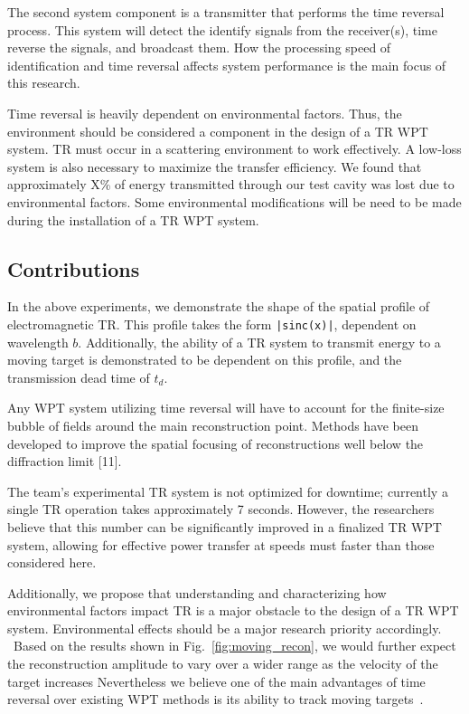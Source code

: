 The second system component is a transmitter that performs the time reversal process.  This system will detect the identify signals from the receiver(s), time reverse the signals, and broadcast them.   How the processing speed of identification and time reversal affects system performance is the main focus of this research.

Time reversal is heavily dependent on environmental factors.  Thus, the environment should be considered a component in the design of a TR WPT system.  TR must occur in a scattering environment to work effectively.  A low-loss system is also necessary to maximize the transfer efficiency. We found that approximately X\% of energy  transmitted through our test cavity was lost due to environmental factors. Some environmental modifications will be need to be made during the installation of a TR WPT system.

\subsection{Contributions}
\label{sec:Contrib}

In the above experiments, we demonstrate the shape of the spatial profile of electromagnetic
TR. This profile takes the form \texttt{|sinc(x)|}, dependent on wavelength $b$.
Additionally, the ability of a TR system to transmit energy to a moving target is 
demonstrated to be dependent on this profile, and the transmission dead 
time of $t_{d}$.

Any WPT system utilizing time reversal will have to account for the 
finite-size bubble of fields around  the  main  reconstruction  point.
Methods  have  been developed  to  improve  the  spatial  focusing  of  reconstructions
well below the diffraction limit [11].

The team’s experimental TR system is not optimized for downtime; currently a
single TR operation takes approximately 7 seconds.  However, the researchers 
believe that this number can be significantly improved in a finalized TR WPT 
system, allowing for effective power transfer at speeds must faster than those 
considered here.

Additionally, we propose that understanding and characterizing how environmental 
factors impact TR is a major obstacle to the design of a TR WPT system. Environmental
effects should be a major research priority accordingly.
\
Based on the results shown in Fig.~\ref{fig:moving_recon}, we would further
expect the reconstruction amplitude to vary over a wider range as the velocity
of the target increases
%
Nevertheless we believe one of the main advantages of time reversal over
existing WPT methods is its ability to track moving
targets~\cite{fink,nltr-wave-chaotic}.

